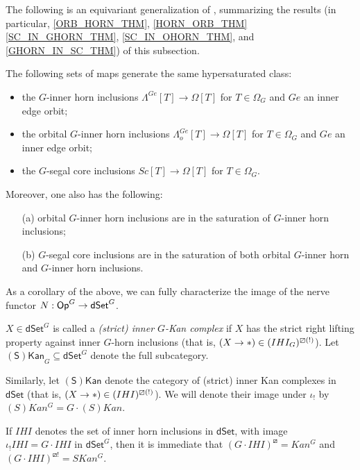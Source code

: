 \documentclass[a4paper,10pt,draft]{article}%
\begin{document}
The following is an equivariant generalization of 
\cite[Props. 2.4 and 2.5]{CM13a},
summarizing the results
(in particular, \cref{ORB_HORN_THM}, \cref{HORN_ORB_THM} \cref{SC_IN_GHORN_THM}, \cref{SC_IN_OHORN_THM}, and \cref{GHORN_IN_SC_THM})
of this subsection.

\begin{proposition}
The following sets of maps generate the same hypersaturated class:
\begin{itemize}
\item the $G$-inner horn inclusions
$\Lambda^{Ge} [T] \to \Omega[T]$ for $T \in \Omega_G$ and $Ge$ an inner edge orbit; 
\item the orbital $G$-inner horn inclusions
$\Lambda^{Ge}_o [T] \to \Omega[T]$ for $T \in \Omega_G$ and $Ge$ an inner edge orbit; 
\item the $G$-segal core inclusions
$Sc [T] \to \Omega[T]$ for $T \in \Omega_G$.
\end{itemize}
Moreover, one also has the following:
\begin{itemize}
	\item[(a)] orbital $G$-inner horn inclusions are in the saturation of $G$-inner horn inclusions;
	\item[(b)] $G$-segal core inclusions are in the saturation of both orbital $G$-inner horn and $G$-inner horn inclusions.
\end{itemize}
\end{proposition}


As a corollary of the above, we can fully characterize the image of the nerve functor $N: \mathsf{Op}^G \to \mathsf{dSet}^G$.

\begin{definition}
      $X \in \mathsf{dSet}^G$ is called a \textit{(strict) inner $G$-Kan complex} if
      $X$ has the strict right lifting property against inner $G$-horn inclusions
      (that is, $(X \to \**) \in (IHI_G)^{\boxslash (!)}$).
      Let $\mathsf{(S)Kan}_G \subseteq \mathsf{dSet}^G$ denote the full subcategory.

      Similarly, let $\mathsf{(S)Kan}$ denote the category of
      (strict) inner Kan complexes in $\mathsf{dSet}$
      (that is, $(X \to \**) \in (IHI)^{\boxslash (!)}$).
      We will denote their image under $\iota_!$ by $(S)Kan^G = G \cdot (S)Kan$.
\end{definition}

\begin{remark}
      If $IHI$ denotes the set of inner horn inclusions in $\mathsf{dSet}$,
      with image $\iota_! IHI = G \cdot IHI$ in $\mathsf{dSet}^G$,
      then it is immediate that $(G \cdot IHI)^{\boxslash} = Kan^G$ and $(G \cdot IHI)^{\boxslash !} = SKan^G$.
\end{remark}
\end{document}
